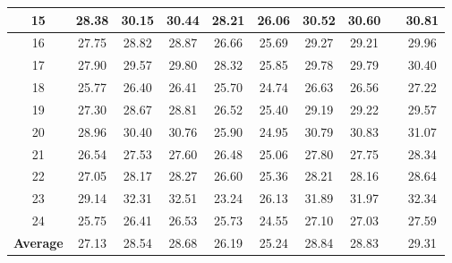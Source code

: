 \documentclass[10pt,twocolumn,letterpaper,sort&compress]{article}
\begin{document}
\begin{table}
\begin{center}
\begin{tabular}{|c||c|c|c|c|c|c|c|c|c|}
\\
\hline
15 & 28.38 & 30.15 & 30.44 & 28.21 & 26.06 & 30.52 & 30.60 &  & 30.81
\\
\hline
16 & 27.75 & 28.82 & 28.87 & 26.66 & 25.69 & 29.27 & 29.21 &  & 29.96
\\
\hline
17 & 27.90 & 29.57 & 29.80 & 28.32 & 25.85 & 29.78 & 29.79 &  & 30.40
\\
\hline
18 & 25.77 & 26.40 & 26.41 & 25.70 & 24.74 & 26.63 & 26.56 &  & 27.22
\\
\hline
19 & 27.30 & 28.67 & 28.81 & 26.52 & 25.40 & 29.19 & 29.22 &  & 29.57 
\\
\hline
20 & 28.96 & 30.40 & 30.76 & 25.90 & 24.95 & 30.79 & 30.83 &  & 31.07
\\
\hline
21 & 26.54 & 27.53 & 27.60 & 26.48 & 25.06 & 27.80 & 27.75 &  & 28.34
\\
\hline
22 & 27.05 & 28.17 & 28.27 & 26.60 & 25.36 & 28.21 & 28.16 &  & 28.64
\\
\hline
23 & 29.14 & 32.31 & 32.51 & 23.24 & 26.13 & 31.89 & 31.97 &  & 32.34
\\
\hline
24 & 25.75 & 26.41 & 26.53 & 25.73 & 24.55 & 27.10 & 27.03 &  & 27.59
\\
\hline
\textbf{Average} & 27.13 & 28.54 & 28.68 & 26.19 & 25.24 & 28.84 & 28.83 &  & 29.31
\\
\hline
\end{tabular}
\end{center}
\end{table}
\end{document}
